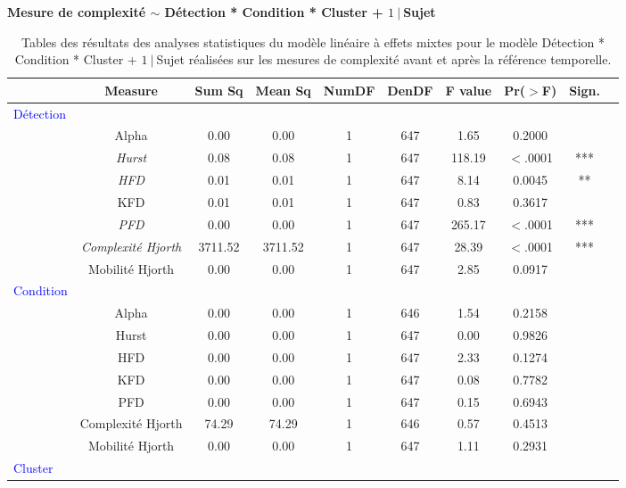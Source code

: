 \begin{table}[!t]
\centering
\scriptsize
\caption[Table des résultats des analyses statistiques pour les mesures de complexité]{Tables des résultats des analyses statistiques du modèle linéaire à effets mixtes pour le modèle Détection * Condition * Cluster + $1~|~$Sujet réalisées sur les mesures de complexité avant et après la référence temporelle.}
\label{tab:table5statsmesurescomplexite}

\textbf{Mesure de complexité $\sim$ Détection * Condition * Cluster + $1~|~$Sujet}

\begin{tabular}{|l|*{9}{c|}}
\hline
& \textbf{Measure} & \textbf{Sum Sq} & \textbf{Mean Sq} & \textbf{NumDF} & \textbf{DenDF} & \textbf{F value} & \textbf{Pr($>$F)} & \textbf{Sign.} \\ 
\hline
\textcolor{blue}{Détection} & & & & & & & & \\ 
\hline
& Alpha & 0.00 & 0.00 & 1 & 647 & 1.65 & 0.2000 & \\ 
& \textit{Hurst} & 0.08 & 0.08 & 1 & 647 & 118.19 & $<$.0001 & *** \\ 
& \textit{HFD} & 0.01 & 0.01 & 1 & 647 & 8.14 & 0.0045 & ** \\ 
& KFD & 0.01 & 0.01 & 1 & 647 & 0.83 & 0.3617 & \\ 
& \textit{PFD} & 0.00 & 0.00 & 1 & 647 & 265.17 & $<$.0001 & *** \\ 
& \textit{Complexité Hjorth} & 3711.52 & 3711.52 & 1 & 647 & 28.39 & $<$.0001 & *** \\ 
& Mobilité Hjorth & 0.00 & 0.00 & 1 & 647 & 2.85 & 0.0917 & \\ 
\hline
\textcolor{blue}{Condition} & & & & & & & & \\ 
\hline
& Alpha & 0.00 & 0.00 & 1 & 646 & 1.54 & 0.2158 & \\ 
& Hurst & 0.00 & 0.00 & 1 & 647 & 0.00 & 0.9826 & \\ 
& HFD & 0.00 & 0.00 & 1 & 647 & 2.33 & 0.1274 & \\ 
& KFD & 0.00 & 0.00 & 1 & 647 & 0.08 & 0.7782 & \\ 
& PFD & 0.00 & 0.00 & 1 & 647 & 0.15 & 0.6943 & \\ 
& Complexité Hjorth & 74.29 & 74.29 & 1 & 646 & 0.57 & 0.4513 & \\ 
& Mobilité Hjorth & 0.00 & 0.00 & 1 & 647 & 1.11 & 0.2931 & \\ 
\hline
\textcolor{blue}{Cluster} & & & & & & & & \\ 

\end{tabular}
\end{table}
